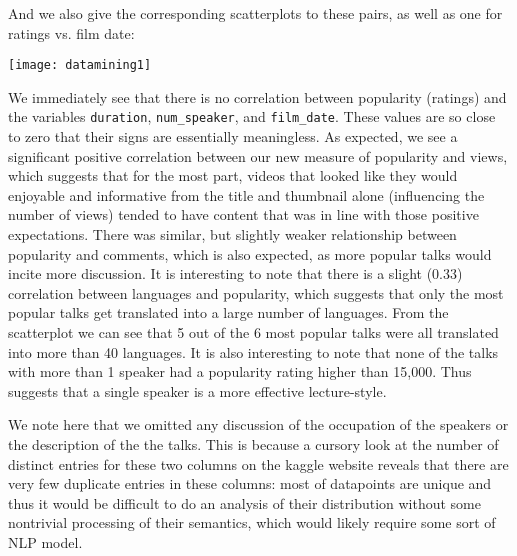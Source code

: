 \documentclass[11pt,oneside,reqno]{amsart}
\theoremstyle{plain}
\theoremstyle{definition}
\theoremstyle{remark}
\newcommand{\inlinecode}{\texttt}
\begin{document}
And we also give the corresponding scatterplots to these pairs, as well as one for ratings vs. film date:

\texttt{[image: datamining1]}

We immediately see that there is no correlation between popularity (ratings) and the variables \inlinecode{duration}, \inlinecode{num\_speaker}, and \inlinecode{film\_date}. These values are so close to zero that their signs are essentially meaningless. As expected, we see a significant positive correlation between our new measure of popularity and views, which suggests that for the most part, videos that looked like they would enjoyable and informative from the title and thumbnail alone (influencing the number of views) tended to have content that was in line with those positive expectations. There was similar, but slightly weaker relationship between popularity and comments, which is also expected, as more popular talks would incite more discussion. It is interesting to note that there is a slight (0.33) correlation between languages and popularity, which suggests that only the most popular talks get translated into a large number of languages. From the scatterplot we can see that 5 out of the 6 most popular talks were all translated into more than 40 languages. It is also interesting to note that none of the talks with more than 1 speaker had a popularity rating higher than 15,000. Thus suggests that a single speaker is a more effective lecture-style. 

We note here that we omitted any discussion of the occupation of the speakers or the description of the the talks. This is because a cursory look at the number of distinct entries for these two columns on the kaggle website reveals that there are very few duplicate entries in these columns: most of datapoints are unique and thus it would be difficult to do an analysis of their distribution without some nontrivial processing of their semantics, which would likely require some sort of NLP model. 
\end{document}
